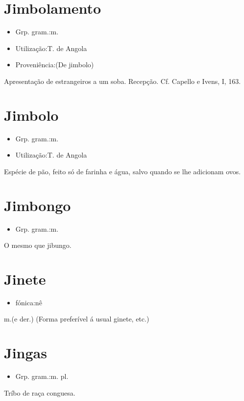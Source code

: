 \documentclass{article}
\begin{document}
\section{Jimbolamento}
\begin{itemize}
\item {Grp. gram.:m.}
\end{itemize}
\begin{itemize}
\item {Utilização:T. de Angola}
\end{itemize}
\begin{itemize}
\item {Proveniência:(De \textunderscore jimbolo\textunderscore )}
\end{itemize}
Apresentação de estrangeiros a um soba.
Recepção. Cf. Capello e Ivens, I, 163.
\section{Jimbolo}
\begin{itemize}
\item {Grp. gram.:m.}
\end{itemize}
\begin{itemize}
\item {Utilização:T. de Angola}
\end{itemize}
Espécie de pão, feito só de farinha e água, salvo quando se lhe adicionam ovos.
\section{Jimbongo}
\begin{itemize}
\item {Grp. gram.:m.}
\end{itemize}
O mesmo que \textunderscore jibungo\textunderscore .
\section{Jinete}
\begin{itemize}
\item {fónica:nê}
\end{itemize}
\textunderscore m.\textunderscore  (e der.)
(Forma preferível á usual \textunderscore ginete\textunderscore , etc.)
\section{Jingas}
\begin{itemize}
\item {Grp. gram.:m. pl.}
\end{itemize}
Tríbo de raça conguesa.
\end{document}
